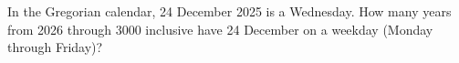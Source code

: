 In the Gregorian calendar, 24 December 2025 is a Wednesday. How many years from 2026 through 3000 inclusive have 24 December on a weekday (Monday through Friday)?
